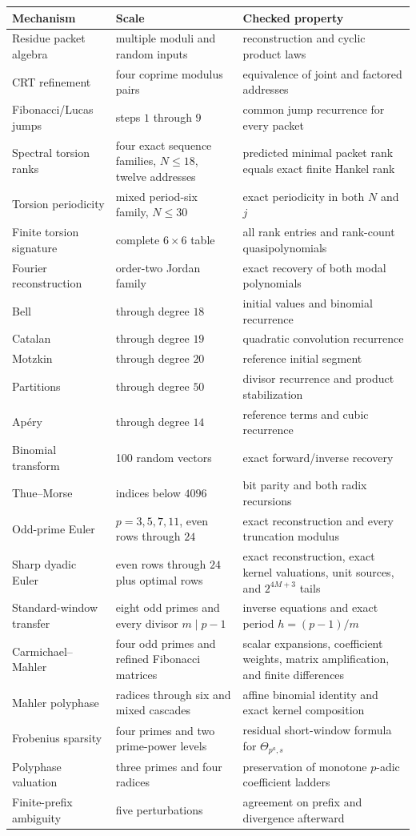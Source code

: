 \documentclass[11pt]{article}
\theoremstyle{definition}\newtheorem{definition}[theorem]{Definition}\newtheorem{example}[theorem]{Example}\newtheorem{construction}[theorem]{Construction}\newtheorem{algorithm}[theorem]{Algorithm}\newtheorem{conjecture}[theorem]{Conjecture}\newtheorem{problem}[theorem]{Problem}
\theoremstyle{remark}\newtheorem{remark}[theorem]{Remark}\newtheorem{boundary}[theorem]{Boundary}\newtheorem{certificate}[theorem]{Computational Certificate}\newtheorem{classical}[theorem]{Classical Input}\newtheorem{principle}[theorem]{Structural Principle}
\begin{document}
\noindent\begin{tabularx}{\linewidth}{@{}L{.23\linewidth}L{.18\linewidth}Y@{}}
\toprule
Mechanism&Scale&Checked property\\
\midrule
Residue packet algebra&multiple moduli and random inputs&reconstruction and cyclic product laws\\
CRT refinement&four coprime modulus pairs&equivalence of joint and factored addresses\\
Fibonacci/Lucas jumps&steps $1$ through $9$&common jump recurrence for every packet\\
Spectral torsion ranks&four exact sequence families, $N\leq18$, twelve addresses&predicted minimal packet rank equals exact finite Hankel rank\\
Torsion periodicity&mixed period-six family, $N\leq30$&exact periodicity in both $N$ and $j$\\
Finite torsion signature&complete $6\times6$ table&all rank entries and rank-count quasipolynomials\\
Fourier reconstruction&order-two Jordan family&exact recovery of both modal polynomials\\
Bell&through degree $18$&initial values and binomial recurrence\\
Catalan&through degree $19$&quadratic convolution recurrence\\
Motzkin&through degree $20$&reference initial segment\\
Partitions&through degree $50$&divisor recurrence and product stabilization\\
Ap\'ery&through degree $14$&reference terms and cubic recurrence\\
Binomial transform&100 random vectors&exact forward/inverse recovery\\
Thue--Morse&indices below $4096$&bit parity and both radix recursions\\
Odd-prime Euler&$p=3,5,7,11$, even rows through $24$&exact reconstruction and every truncation modulus\\
Sharp dyadic Euler&even rows through $24$ plus optimal rows&exact reconstruction, exact kernel valuations, unit sources, and $2^{4M+3}$ tails\\
Standard-window transfer&eight odd primes and every divisor $m\mid p-1$&inverse equations and exact period $h=(p-1)/m$\\
Carmichael--Mahler&four odd primes and refined Fibonacci matrices&scalar expansions, coefficient weights, matrix amplification, and finite differences\\
Mahler polyphase&radices through six and mixed cascades&affine binomial identity and exact kernel composition\\
Frobenius sparsity&four primes and two prime-power levels&residual short-window formula for $\Theta_{p^a,s}$\\
Polyphase valuation&three primes and four radices&preservation of monotone $p$-adic coefficient ladders\\
Finite-prefix ambiguity&five perturbations&agreement on prefix and divergence afterward\\
\bottomrule
\end{tabularx}
\end{document}
